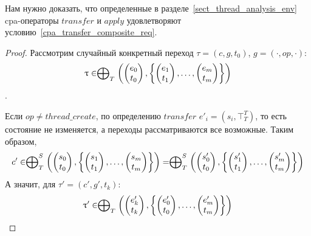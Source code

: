 Нам нужно доказать, что определенные в разделе~\ref{sect_thread_analysis_env} cpa-операторы $transfer$ и $apply$ удовлетворяют условию~\ref{cpa_transfer_composite_req}.

\begin{proof}
Рассмотрим случайный конкретный переход $\tau = (c, g, t_0)$, $g=(\cdot, op, \cdot)$:
$$\uptau \in  \mathrel{\bigoplus}_{T}
\left(
\begin{pmatrix}
e_0 \\
t_0 
\end{pmatrix},
\left\{
\begin{pmatrix}
e_1 \\
t_1 
\end{pmatrix},
\dots ,
\begin{pmatrix}
e_m \\
t_m 
\end{pmatrix}
\right\}
\right)$$.

Если $op \neq thread\_create$, по определению $transfer$ $e'_i = (s_i, \top^T_T)$, то есть состояние не изменяется, а переходы рассматриваются все возможные. 
Таким образом, 
$$c' \in  \mathrel{\bigoplus}^S_{T}
\left(
\begin{pmatrix}
s_0 \\
t_0 
\end{pmatrix},
\left\{
\begin{pmatrix}
s_1 \\
t_1 
\end{pmatrix},
\dots ,
\begin{pmatrix}
s_m \\
t_m 
\end{pmatrix}
\right\}
\right) = \mathrel{\bigoplus}^S_{T}
\left(
\begin{pmatrix}
s'_0 \\
t_0 
\end{pmatrix},
\left\{
\begin{pmatrix}
s'_1 \\
t_1 
\end{pmatrix},
\dots ,
\begin{pmatrix}
s'_m \\
t_m 
\end{pmatrix}
\right\}
\right)$$
А значит, для $\tau' = (c', g', t_k)$:
$$\uptau'  \in \mathrel{\bigoplus}_{T}
\left(
\begin{pmatrix}
e'_k \\
t_k 
\end{pmatrix},
\left\{
\begin{pmatrix}
e'_0 \\
t_0 
\end{pmatrix},
\dots ,
\begin{pmatrix}
e'_m \\
t_m 
\end{pmatrix}
\right\}
\right)$$


\end{proof}
